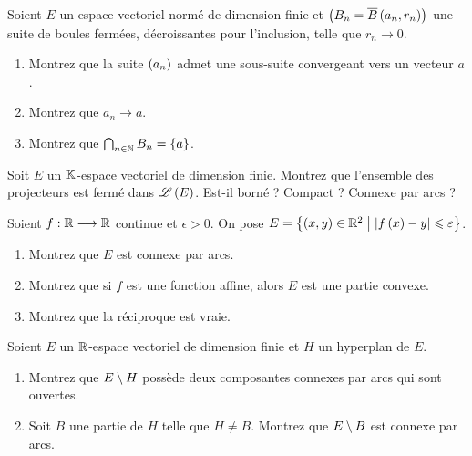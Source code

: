 \begin{exopss}[Exercice 25]
Soient \(E\) un espace vectoriel normé de dimension finie et \(\left(B_n=\overline{B}\left(a_n,r_n\right)\right)\) une suite de boules fermées, décroissantes pour l'inclusion, telle que \(r_n\to0\).

\begin{enumerate}
    \item Montrez que la suite \(\left(a_n\right)\) admet une sous-suite convergeant vers un vecteur \(a\). \\
    \item Montrez que \(a_n\to a\). \\
    \item Montrez que \(\bigcap_{n\in\mathbb{N}}B_n=\left\lbrace a\right\rbrace\).
\end{enumerate}
\end{exopss}

\begin{corr}
\end{corr}

\begin{exoss}[Exercice 26]
Soit \(E\) un \(\mathbb{K}\)-espace vectoriel de dimension finie. Montrez que l'ensemble des projecteurs est fermé dans \(\mathscr{L}\left(E\right)\). Est-il borné ? Compact ? Connexe par arcs ?
\end{exoss}

\begin{corr}
\end{corr}

\begin{exoss}[Exercice 27]
Soient \(f:\mathbb{R}\longrightarrow\mathbb{R}\) continue et \(\epsilon>0\). On pose \(E=\left\lbrace\left(x,y\right)\in\mathbb{R}^2\;\middle|\;\left\lvert f\left(x\right)-y\right\rvert\leqslant\varepsilon\right\rbrace\).

\begin{enumerate}
    \item Montrez que \(E\) est connexe par arcs. \\
    \item Montrez que si \(f\) est une fonction affine, alors \(E\) est une partie convexe. \\
    \item Montrez que la réciproque est vraie.
\end{enumerate}
\end{exoss}

\begin{corr}
\end{corr}

\begin{exoss}[Exercice 28]
Soient \(E\) un \(\mathbb{R}\)-espace vectoriel de dimension finie et \(H\) un hyperplan de \(E\).

\begin{enumerate}
    \item Montrez que \(E\setminus H\) possède deux composantes connexes par arcs qui sont ouvertes. \\
    \item Soit \(B\) une partie de \(H\) telle que \(H\not=B\). Montrez que \(E\setminus B\) est connexe par arcs.
\end{enumerate}
\end{exoss}

